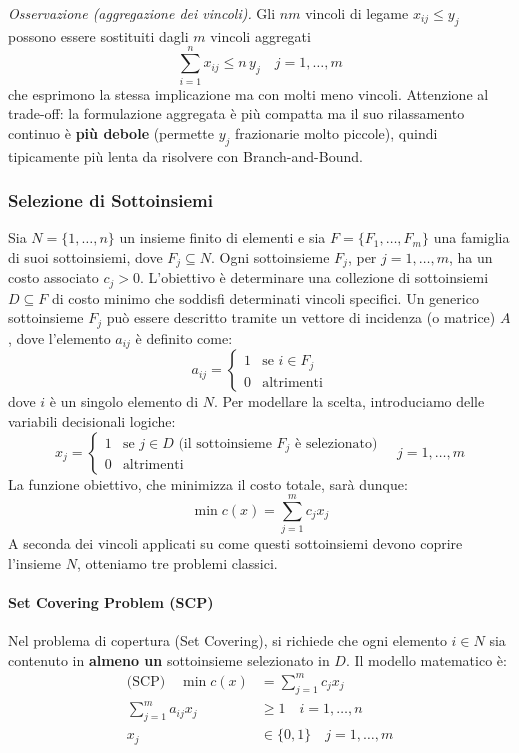 \documentclass[12pt]{extarticle} %
\begin{document}
\noindent\textit{Osservazione (aggregazione dei vincoli).} Gli $nm$ vincoli di legame $x_{ij}\le y_j$ possono essere sostituiti dagli $m$ vincoli aggregati
\[
\sum_{i=1}^n x_{ij} \le n\, y_j \quad j=1,\dots,m
\]
che esprimono la stessa implicazione ma con molti meno vincoli. Attenzione al trade-off: la formulazione aggregata è più compatta ma il suo rilassamento continuo è \textbf{più debole} (permette $y_j$ frazionarie molto piccole), quindi tipicamente più lenta da risolvere con Branch-and-Bound.

\subsubsection{Selezione di Sottoinsiemi}
Sia $N=\{1,\dots,n\}$ un insieme finito di elementi e sia $F=\{F_1,\dots,F_m\}$ una famiglia di suoi sottoinsiemi, dove $F_j \subseteq N$.
Ogni sottoinsieme $F_j$, per $j=1,\dots,m$, ha un costo associato $c_j > 0$.
L'obiettivo è determinare una collezione di sottoinsiemi $D \subseteq F$ di costo minimo che soddisfi determinati vincoli specifici. Un generico sottoinsieme $F_j$ può essere descritto tramite un vettore di incidenza (o matrice) $A$, dove l'elemento $a_{ij}$ è definito come:
\[
a_{ij} = \begin{cases}
1 & \text{se } i \in F_j \\
0 & \text{altrimenti}
\end{cases}
\]
dove $i$ è un singolo elemento di $N$.
Per modellare la scelta, introduciamo delle variabili decisionali logiche:
\[
x_j = \begin{cases}
1 & \text{se } j \in D \text{ (il sottoinsieme } F_j \text{ è selezionato)} \\
0 & \text{altrimenti}
\end{cases} \quad j=1,\dots,m
\]
La funzione obiettivo, che minimizza il costo totale, sarà dunque:
\[
\min c(x) = \sum_{j=1}^m c_j x_j
\]
A seconda dei vincoli applicati su come questi sottoinsiemi devono coprire l'insieme $N$, otteniamo tre problemi classici.

\paragraph{Set Covering Problem (SCP)}
Nel problema di copertura (Set Covering), si richiede che ogni elemento $i \in N$ sia contenuto in \textbf{almeno un} sottoinsieme selezionato in $D$.
Il modello matematico è:
\[
\begin{aligned}
\text{(SCP)} \quad \min c(x) &= \sum_{j=1}^m c_j x_j \\
\sum_{j=1}^m a_{ij}x_j &\ge 1 \quad i=1,\dots,n \\
x_j &\in \{0,1\} \quad j=1,\dots,m
\end{aligned}
\]
\end{document}
